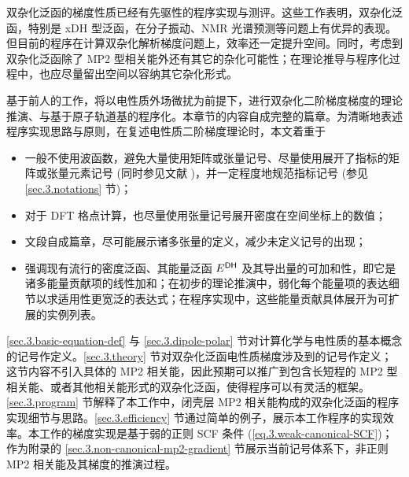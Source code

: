 双杂化泛函的梯度性质已经有先驱性的程序实现与测评\cite{Neese-Grimme.JCP.2007, Biczysko-Barone.JCTC.2010, Su-Xu.JCC.2013, Stoychev-Neese.JCTC.2018, Yan-Xu.JCTC.2022}。这些工作表明，双杂化泛函，特别是 xDH 型泛函，在分子振动、NMR 光谱预测等问题上有优异的表现。但目前的程序在计算双杂化解析梯度问题上，效率还一定提升空间。同时，考虑到双杂化泛函除了 MP2 型相关能外还有其它的杂化可能性；在理论推导与程序化过程中，也应尽量留出空间以容纳其它杂化形式。

基于前人的工作\cite{Gerratt-Mills.JCP.1968, Gerratt-Mills.JCP.1968a, Pople-Binkley.IJQC.1979, Dykstra-Jasien.CPL.1984, Handy-Schaefer.JCP.1984, Handy-Simandiras.CPL.1985, Pulay-Saeboe.TCA.1986, Trucks-Bartlett.CPL.1988, Frisch-Pople.CP.1990, Frisch-Pople.CPL.1990, Frisch-Pople.CPL.1990a, Gauss-Bartlett.JCP.1992, Stanton-Bartlett.CPL.1992, Johnson-Frisch.CPL.1993, Head-Gordon-Head-Gordon.CPL.1994, Yamaguchi-Schaefer.Oxford.1994, Weigend-Haeser.TCA.1997, Aikens-Gordon.TCA.2003, Cammi-Frisch.TCA.2004, Distasio-Head-Gordon.JCC.2007, Neese-Grimme.JCP.2007, Biczysko-Barone.JCTC.2010, Su-Xu.JCC.2013, Ji-Jung.JCTC.2013, Bykov-Neese.MP.2015, Stoychev-Neese.JCTC.2018, Yan-Xu.JCTC.2022}，将以电性质外场微扰为前提下，进行双杂化二阶梯度梯度的理论推演、与基于原子轨道基的程序化。本章节的内容自成完整的篇章。为清晰地表述程序实现思路与原则，在复述电性质二阶梯度理论时，本文着重于
\begin{itemize}[nosep]
    \item 一般不使用波函数，避免大量使用矩阵或张量记号、尽量使用展开了指标的矩阵或张量元素记号 (同时参见文献 )，并一定程度地规范指标记号 (参见 \ref{sec.3.notations} 节)；
    \item 对于 DFT 格点计算，也尽量使用张量记号展开密度在空间坐标上的数值；
    \item 文段自成篇章，尽可能展示诸多张量的定义，减少未定义记号的出现；
    \item 强调现有流行的密度泛函、其能量泛函 $E^{\textsf{DH}}$ 及其导出量的可加和性，即它是诸多能量贡献项的线性加和；在初步的理论推演中，弱化每个能量项的表达细节以求适用性更宽泛的表达式；在程序实现中，这些能量贡献具体展开为可扩展的实例列表。
\end{itemize}
\ref{sec.3.basic-equation-def} 与 \ref{sec.3.dipole-polar} 节对计算化学与电性质的基本概念的记号作定义。\ref{sec.3.theory} 节对双杂化泛函电性质梯度涉及到的记号作定义；这节内容不引入具体的 MP2 相关能，因此预期可以推广到包含长短程的 MP2 型相关能、或者其他相关能形式的双杂化泛函，使得程序可以有灵活的框架。\ref{sec.3.program} 节解释了本工作中，闭壳层 MP2 相关能构成的双杂化泛函的程序实现细节与思路。\ref{sec.3.efficiency} 节通过简单的例子，展示本工作程序的实现效率。本工作的梯度实现是基于弱的正则 SCF 条件 (\ref{eq.3.weak-canonical-SCF})；作为附录的 \ref{sec.3.non-canonical-mp2-gradient} 节展示当前记号体系下，非正则 MP2 相关能及其梯度的推演过程。

